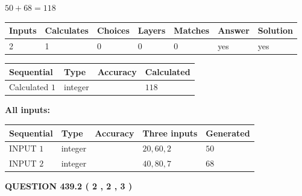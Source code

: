 \documentclass[12pt]{article}
\begin{document}
 

$ %
50 +  %
68=   %
118$
 
 
\noindent{}
 
 

 
   
   
   
   
\noindent\begin{tabular}{|l|l|l|l|l|l|l|}
 \hline
Inputs & Calculates & Choices & Layers & Matches & Answer & Solution \\ \hline
 2  & 
 1  & 
 0
  & 
 0  & 
 0  & 
  yes & 
  yes 
  \\ \hline
 \end{tabular}
   
   
   
   
\noindent{}
   
   
  
  
\noindent\begin{tabular}{|l|l|l|l|}
\hline
 Sequential & Type & Accuracy & Calculated \\ 
\hline
 
 
  Calculated $  1 $ & integer &  & 
  $ 118 $ 
 \\  \hline  
 \end{tabular}
   
   
   
   
\noindent\vspace{0.1in}\hspace{-0.08in} {\textbf{\Large{All inputs: }}}
   
   
  
  
\noindent\begin{tabular}{|l|l|l|l|l|}
\hline
 Sequential & Type & Accuracy & Three inputs & Generated \\ 
\hline
 
 
  INPUT $  1 $ & integer &  & $
 20
 , 
 60
 , 
 2
 $ & $ 50 $ 
 \\  \hline  
 
 
  INPUT $  2 $ & integer &  & $
 40
 , 
 80
 , 
 7
 $ & $ 68 $ 
 \\  \hline  
 \end{tabular}
   
   
  
\vspace{0.2in}
  
{\textbf{\Large{QUESTION
439.2 
 ( 2 , 2 , 3 )
}}}
  
\end{document}
